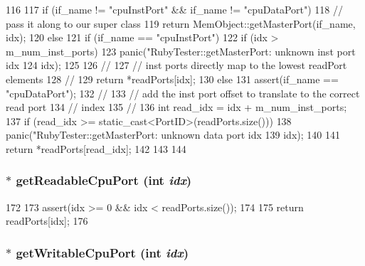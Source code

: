\begin{DoxyCode}
116 {
117     if (if_name != "cpuInstPort" && if_name != "cpuDataPort") {
118         // pass it along to our super class
119         return MemObject::getMasterPort(if_name, idx);
120     } else {
121         if (if_name == "cpuInstPort") {
122             if (idx > m_num_inst_ports) {
123                 panic("RubyTester::getMasterPort: unknown inst port idx %
124                       idx);
125             }
126             //
127             // inst ports directly map to the lowest readPort elements
128             //
129             return *readPorts[idx];
130         } else {
131             assert(if_name == "cpuDataPort");
132             //
133             // add the inst port offset to translate to the correct read port
134             // index
135             //
136             int read_idx = idx + m_num_inst_ports;
137             if (read_idx >= static_cast<PortID>(readPorts.size())) {
138                 panic("RubyTester::getMasterPort: unknown data port idx %
139                       idx);
140             }
141             return *readPorts[read_idx];
142         }
143     }
144 }
\end{DoxyCode}
\hypertarget{classRubyTester_aa82782a52c45fe9caea72eb6beee63c3}{
\subsubsection[{getReadableCpuPort}]{ $\ast$ getReadableCpuPort (int {\em idx})}}
\label{classRubyTester_aa82782a52c45fe9caea72eb6beee63c3}



\begin{DoxyCode}
172 {
173     assert(idx >= 0 && idx < readPorts.size());
174 
175     return readPorts[idx];
176 }
\end{DoxyCode}
\hypertarget{classRubyTester_a77680df4a8d2917c7f961e56eff08e96}{
\subsubsection[{getWritableCpuPort}]{ $\ast$ getWritableCpuPort (int {\em idx})}}
\label{classRubyTester_a77680df4a8d2917c7f961e56eff08e96}




